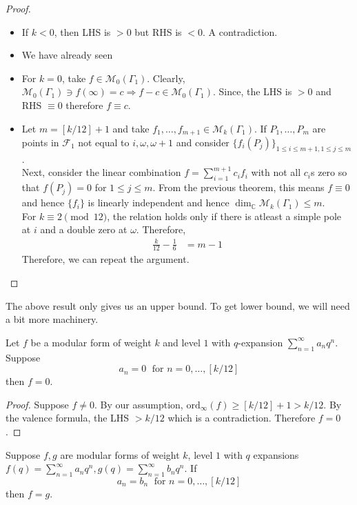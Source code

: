 \documentclass[oneside, 12pt]{scrbook}
\newcommand{\CC}{\mathbb C}
\newcommand{\ord}{\mathrm{ord}}
\newcommand{\ds}{\displaystyle}
\newcommand{\Mm}{\mathcal{M}}
\theoremstyle{theorem}
\begin{document}
\begin{proof}
\begin{itemize}
\item If $k < 0$, then LHS is $>0$ but RHS is $<0$. A contradiction.
\item We have already seen
\item For $k=0$, take $f \in \Mm_{0}(\Gamma_{1})$. Clearly, $\Mm_{0}(\Gamma_{1}) \ni f(\infty)=c \Rightarrow f-c \in \Mm_{0}(\Gamma_{1})$. Since, the LHS is $>0$ and RHS $\equiv 0$ therefore $f \equiv c$.
\item Let $m = [k/12] + 1$ and take $f_{1}, \hdots , f_{m+1} \in \Mm_{k}(\Gamma_{1})$. If $P_{1}, \hdots , P_{m}$ are points in $\mathcal{F}_{1}$ not equal to $i, \omega , \omega + 1$ and consider $\{f_{i}(P_{j})\}_{1\le i \le m+1 , 1\le j \le m}$. \\
Next, consider the linear combination $f = \ds{\sum_{i=1}^{m+1}c_{i}f_{i}}$ with not all $c_{i}$s zero so that $f(P_{j})=0$ for $1 \le j \le m$. From the previous theorem, this means $f \equiv 0$ and hence $\{f_{i}\}$ is linearly independent and hence $\dim_{\CC}\Mm_{k}(\Gamma_{1}) \le m$. \\
For $k \equiv 2 \pmod{12}$, the relation holds only if there is atleast a simple pole at $i$ and a double zero at $\omega$. Therefore, 
\begin{align*}
\frac{k}{12} -\frac{1}{6} &= m-1
\end{align*} 
Therefore, we can repeat the argument.
\end{itemize}
\end{proof}

\begin{remark}
The above result only gives us an upper bound. To get lower bound, we will need a bit more machinery.
\end{remark}

\begin{theorem}
Let $f$ be a modular form of weight $k$ and level $1$ with $q$-expansion $\sum_{n=1}^\infty a_{n}q^n$. Suppose $$a_{n}=0 \; \text{ for } n =0, \hdots , [k/12]$$ then $f=0$.
\end{theorem}

\begin{proof}
Suppose $f\neq 0$. By our assumption, $\ord_{\infty}(f) \geq [k/12] + 1 > k/12$. By the valence formula, the LHS $> k/12$ which is a contradiction. Therefore $f=0$.
\end{proof}

\begin{corollary}
Suppose $f,g$ are modular forms of weight $k$, level $1$ with $q$ expansions $f(q)=\sum_{n=1}^\infty a_{n}q^n, g(q)=\sum_{n=1}^\infty b_{n}q^n$. If $$a_{n}=b_{n} \; \text{ for } n =0, \hdots , [k/12]$$ then $f=g$.
\end{corollary}
\end{document}
